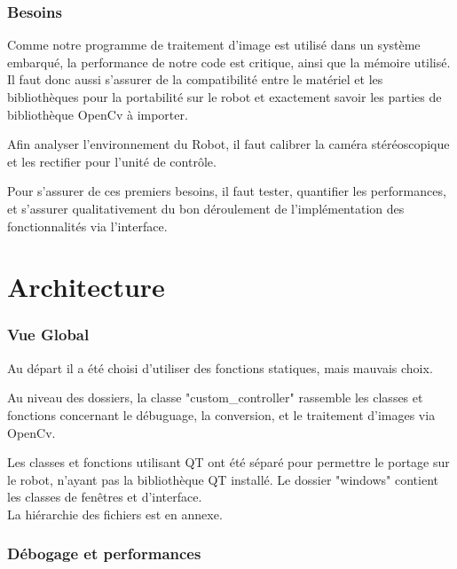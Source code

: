 \documentclass{article}
\begin{document}
\section{Besoins}

Comme notre programme de traitement d'image est utilisé dans un système embarqué, la performance de notre code est critique, ainsi que la mémoire utilisé. Il faut donc aussi s'assurer de la compatibilité entre le matériel et les bibliothèques pour la portabilité sur le robot et exactement savoir les parties de bibliothèque OpenCv à importer.
\par\leavevmode\par
Afin analyser l'environnement du Robot, il faut calibrer la caméra stéréoscopique et les rectifier pour l'unité de contrôle.
\par\leavevmode\par
Pour s'assurer de ces premiers besoins, il faut tester, quantifier les performances, et s'assurer qualitativement du bon déroulement de l'implémentation des fonctionnalités via l'interface.\\

\newpage
\part{Architecture}

\section{Vue Global}

Au départ il a été choisi d'utiliser des fonctions statiques, mais mauvais choix.
\par\leavevmode\par
Au niveau des dossiers, la classe "custom\_controller" rassemble les classes et fonctions concernant le débuguage, la conversion, et le traitement d'images via OpenCv.
\par\leavevmode\par
Les classes et fonctions utilisant QT ont été séparé pour permettre le portage sur le robot, n'ayant pas la bibliothèque QT installé.
Le dossier "windows" contient les classes de fenêtres et d'interface.\\
La hiérarchie des fichiers est en annexe.\\

\par\leavevmode\par
\section{Débogage et performances}
\end{document}
